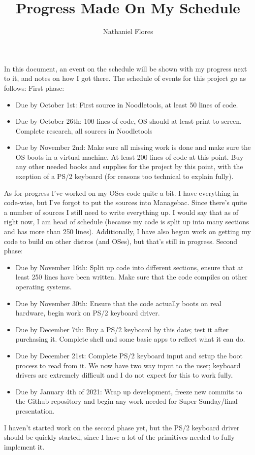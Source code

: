 \documentclass[a4paper,10pt]{article}
\title{Progress Made On My Schedule}
\author{Nathaniel Flores}
\begin{document}
\maketitle
In this document, an event on the schedule will be shown with my progress next to it, and notes on how I got there. The schedule of events for this project go as follows:
\newline
\newline
First phase:
\begin{itemize}
 \item Due by October 1st: First source in Noodletools, at least 50 lines of code.
 \item Due by October 26th: 100 lines of code, OS should at least print to screen. Complete research, all sources in Noodletools
 \item Due by November 2nd: Make sure all missing work is done and make sure the OS boots in a virtual machine. At least 200 lines of code at this point. Buy any other needed books and supplies for the project by this point, with the exeption of a PS/2 keyboard (for reasons too technical to explain fully).
\end{itemize}
As for progress I've worked on my OSes code quite a bit. I have everything in code-wise, but I've forgot to put the sources into Managebac. Since there's quite a number of sources I still need to write everything up. I would say that as of right now, I am head of schedule (because my code is split up into many sections and has more than 250 lines). Additionally, I have also begun work on getting my code to build on other distros (and OSes), but that's still in progress.
Second phase:
\begin{itemize}
 \item Due by November 16th: Split up code into different sections, ensure that at least 250 lines have been written. Make sure that the code compiles on other operating systems.
 \item Due by November 30th: Ensure that the code actually boots on real hardware, begin work on PS/2 keyboard driver.
 \item Due by December 7th: Buy a PS/2 keyboard by this date; test it after purchasing it. Complete shell and some basic apps to reflect what it can do.
 \item Due by December 21st: Complete PS/2 keyboard input and setup the boot process to read from it. We now have two way input to the user; keyboard drivers are extremely difficult and I do not expect for this to work fully.
 \item Due by January 4th of 2021: Wrap up development, freeze new commits to the Github repository and begin any work needed for Super Sunday/final presentation.
\end{itemize}
I haven't started work on the second phase yet, but the PS/2 keyboard driver should be quickly started, since I have a lot of the primitives needed to fully implement it.
\end{document}
